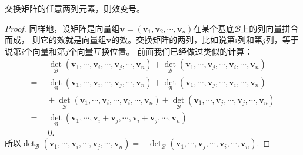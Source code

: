 \documentclass[12pt,UTF8,fontset=none]{ctexbook}
\begin{document}
\begin{pp}\label{pp:10_37}
    交换矩阵的任意两列元素，则效变号。
\end{pp}
\begin{proof} %
    同样地，设矩阵是向量组$\mathbf{v} = (\mathbf{v}_1, \mathbf{v}_2, \cdots , \mathbf{v}_n)$在某个基底$\mathcal{B}$上的列向量拼合而成，
    则它的效就是向量组$\mathbf{v}$的效。交换矩阵的两列，比如说第$i$列和第$j$列，等于说第$i$个向量和第$j$个向量互换位置。
    前面我们已经做过类似的计算：
    \begin{align*}
        & \,\,\,\det_\mathcal{B} (\mathbf{v}_1,  \cdots , \mathbf{v}_i, \cdots , \mathbf{v}_j, \cdots , \mathbf{v}_n) + \det_\mathcal{B} (\mathbf{v}_1,  \cdots , \mathbf{v}_j, \cdots , \mathbf{v}_i, \cdots , \mathbf{v}_n)  \\
        =& \,\,\, \det_\mathcal{B} (\mathbf{v}_1,  \cdots , \mathbf{v}_i, \cdots , \mathbf{v}_j, \cdots , \mathbf{v}_n) + \det_\mathcal{B} (\mathbf{v}_1,  \cdots , \mathbf{v}_j, \cdots , \mathbf{v}_i, \cdots , \mathbf{v}_n)  \\
        & \,\, + \det_\mathcal{B} (\mathbf{v}_1,  \cdots , \mathbf{v}_i, \cdots , \mathbf{v}_i, \cdots , \mathbf{v}_n) + \det_\mathcal{B} (\mathbf{v}_1,  \cdots , \mathbf{v}_j, \cdots , \mathbf{v}_j, \cdots , \mathbf{v}_n)  \\
        =& \,\,\,\det_\mathcal{B} (\mathbf{v}_1,  \cdots , \mathbf{v}_i + \mathbf{v}_j, \cdots , \mathbf{v}_i + \mathbf{v}_j, \cdots , \mathbf{v}_n)  \\
        =& \,\,\, 0. 
    \end{align*}
    所以$ \det_\mathcal{B} (\mathbf{v}_1,  \cdots , \mathbf{v}_i, \cdots , \mathbf{v}_j, \cdots , \mathbf{v}_n) = - \det_\mathcal{B} (\mathbf{v}_1,  \cdots , \mathbf{v}_j, \cdots , \mathbf{v}_i, \cdots , \mathbf{v}_n). $
\end{proof}
\end{document}
